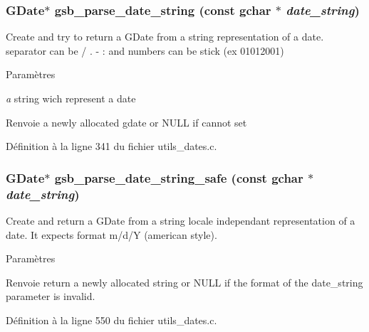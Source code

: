 \subsubsection[{gsb\_\-parse\_\-date\_\-string}]{\setlength{\rightskip}{0pt plus 5cm}GDate$\ast$ gsb\_\-parse\_\-date\_\-string (const gchar $\ast$ {\em date\_\-string})}\label{utils__dates_8c_a76c6dc10a356af3bd3a74738d41960a8}
Create and try to return a GDate from a string representation of a date. separator can be / . -\/ : and numbers can be stick (ex 01012001)


\begin{DoxyParams}{Paramètres}
\item[{\em a}]string wich represent a date\end{DoxyParams}
\begin{DoxyReturn}{Renvoie}
a newly allocated gdate or NULL if cannot set 
\end{DoxyReturn}


Définition à la ligne 341 du fichier utils\_\-dates.c.

\subsubsection[{gsb\_\-parse\_\-date\_\-string\_\-safe}]{\setlength{\rightskip}{0pt plus 5cm}GDate$\ast$ gsb\_\-parse\_\-date\_\-string\_\-safe (const gchar $\ast$ {\em date\_\-string})}\label{utils__dates_8c_a79ec6369fd094262ad9374b115068c17}
Create and return a GDate from a string locale independant representation of a date. It expects format m/d/Y (american style).


\begin{DoxyParams}{Paramètres}
\item[{\em }]\end{DoxyParams}
\begin{DoxyReturn}{Renvoie}
return a newly allocated string or NULL if the format of the date\_\-string parameter is invalid. 
\end{DoxyReturn}


Définition à la ligne 550 du fichier utils\_\-dates.c.

